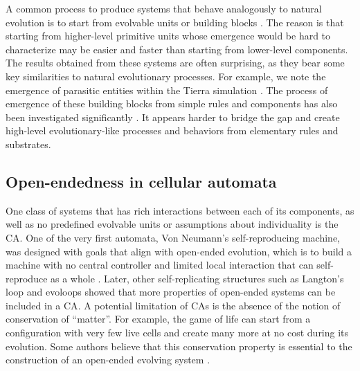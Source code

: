 A common process to produce systems that behave analogously to natural evolution
is to start from evolvable units or building blocks
\parencite{rayApproachSynthesisLife1991, simsEvolvingVirtualCreatures1994,
  ofriaAvidaSoftwarePlatform2004, yaegerComputationalGeneticsPhysiology1994,
  channonImprovingStillPassing2003, spectorDivisionBlocksOpenended2007,
  sorosIdentifyingNecessaryConditions2014}. The reason is that starting from
higher-level primitive units whose emergence would be hard to characterize may
be easier and faster than starting from lower-level components. The results obtained
from these systems are often surprising, as they bear some key similarities
to natural evolutionary processes. For example, we note the emergence of
parasitic entities within the Tierra simulation
\parencite{rayApproachSynthesisLife1991}. The process of emergence of these
building blocks from simple rules and components has also been investigated
significantly \parencite{bagleySpontaneousEmergenceMetabolism1991,
  huttonEvolvableSelfReproducingCells2007, flammEvolutionMetabolicNetworks2010,
  sayamaSeekingOpenendedEvolution2011}. It appears harder to bridge the gap and
create high-level evolutionary-like processes and behaviors from elementary
rules and substrates.

\subsection{Open-endedness in cellular automata}
One class of systems that has rich interactions between each of its components, as
well as no predefined evolvable units or assumptions about individuality is the
\ac{CA}. One of the very first automata, Von Neumann's self-reproducing machine,
was designed with goals that align with open-ended evolution, which is to build
a machine with no central controller and limited local interaction that can
self-reproduce as a whole
\parencite{vonneumannTheorySelfreproducingAutomata1966,
  pesaventoImplementationNeumannSelfReproducing1995}. Later, other
self-replicating structures such as Langton's loop
\parencite{langtonSelfreproductionCellularAutomata1984} and evoloops
\parencite{sayamaNewStructurallyDissolvable1999,
  salzbergComplexGeneticEvolution2004} showed that more properties of open-ended
systems can be included in a \ac{CA}. A potential limitation of \acp{CA} is the
absence of the notion of conservation of ``matter''. For example, the game of life
can start from a configuration with very few live cells and create many more at
no cost during its evolution. Some authors believe that this conservation
property is essential to the construction of an open-ended evolving system
\parencite{taylorChapterCreativityEvolution2002}.

